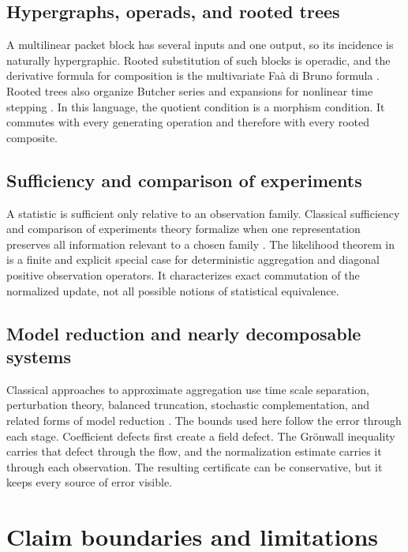 \subsection{Hypergraphs, operads, and rooted trees}
A multilinear packet block has several inputs and one output, so its incidence is naturally hypergraphic.  Rooted substitution of such blocks is operadic, and the derivative formula for composition is the multivariate Fa\`a di Bruno formula \cite{PRIQ:ConstantineSavits1996}.  Rooted trees also organize Butcher series and expansions for nonlinear time stepping \cite{PRIQ:Butcher1972,PRIQ:HairerLubichWanner2006}.  In this language, the quotient condition is a morphism condition.  It commutes with every generating operation and therefore with every rooted composite.

\subsection{Sufficiency and comparison of experiments}
A statistic is sufficient only relative to an observation family.  Classical sufficiency and comparison of experiments theory formalize when one representation preserves all information relevant to a chosen family \cite{PRIQ:HalmosSavage1949,PRIQ:Blackwell1953}.  The likelihood theorem in  is a finite and explicit special case for deterministic aggregation and diagonal positive observation operators.  It characterizes exact commutation of the normalized update, not all possible notions of statistical equivalence.

\subsection{Model reduction and nearly decomposable systems}
Classical approaches to approximate aggregation use time scale separation, perturbation theory, balanced truncation, stochastic complementation, and related forms of model reduction \cite{PRIQ:SimonAndo1961,PRIQ:Meyer1989,PRIQ:Antoulas2005}.  The bounds used here follow the error through each stage.  Coefficient defects first create a field defect.  The Grönwall inequality carries that defect through the flow, and the normalization estimate carries it through each observation.  The resulting certificate can be conservative, but it keeps every source of error visible.

\section{Claim boundaries and limitations}\label{PRIQ:sec:limitations}

